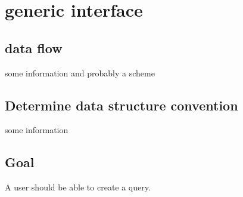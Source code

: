 \chapter{generic interface}



\section{data flow}
    some information and probably a scheme
\section{Determine data structure convention}
    some information

\section{Goal}
A user should be able to create a query.

    
